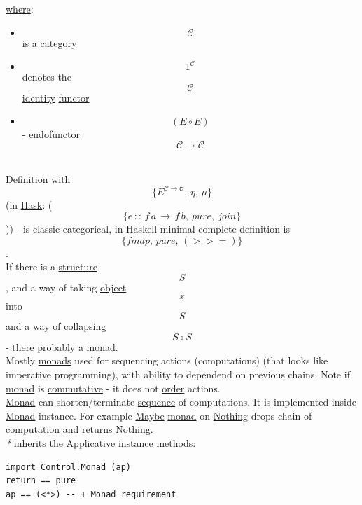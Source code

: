\documentclass[11pt]{article}
\begin{document}
\hyperref[org3e5903d]{where}:\\
\begin{itemize}
\item $$ \mathcal{C} $$ is a \hyperref[org0450535]{category}\\
\item $$ 1^{\mathcal{C}} $$ denotes the $$ \mathcal{C} $$ \hyperref[org9b95fd5]{identity} \hyperref[orgf2f6841]{functor}\\
\item $$ (E \circ E) $$ - \hyperref[orga4a1776]{endofunctor} $$ \mathcal{C \to C} $$\\
\end{itemize}

Definition with $$ \{E^{\mathcal{C \to C}}, \, \eta, \, \mu\} $$ (in \hyperref[org02813f7]{Hask}: ($$ \{e \, :: \, f \, a \, \to \, f \, b, \ pure, \ join\} $$)) - is classic categorical, in Haskell minimal complete definition is $$ \{fmap, \, pure, \, (>>=)\} $$.\\

If there is a \hyperref[org8051f61]{structure} $$ S $$, and a way of taking \hyperref[org4be0e9d]{object} $$ x $$ into $$ S $$ and a way of collapsing $$ S \circ S $$ - there probably a \hyperref[org86a5d95]{monad}.\\

Mostly \hyperref[org0d4a4ef]{monads} used for sequencing actions (computations) (that looks like imperative programming), with ability to dependend on previous chains. Note if \hyperref[org86a5d95]{monad} is \hyperref[orgb53f83d]{commutative} - it does not \hyperref[orgc0a359b]{order} actions.\\

\hyperref[org86a5d95]{Monad} can shorten/terminate \hyperref[org522d1b0]{sequence} of computations. It is implemented inside \hyperref[org86a5d95]{Monad} instance. For example \hyperref[org8347bae]{Maybe} \hyperref[org86a5d95]{monad} on \hyperref[org35c2c9d]{Nothing} drops chain of computation and returns \hyperref[org35c2c9d]{Nothing}.\\

\emph{*} inherits the \hyperref[org2dfdf4a]{Applicative} instance methods:\\
\begin{verbatim}
import Control.Monad (ap)
return == pure
ap == (<*>) -- + Monad requirement
\end{verbatim}
\end{document}

